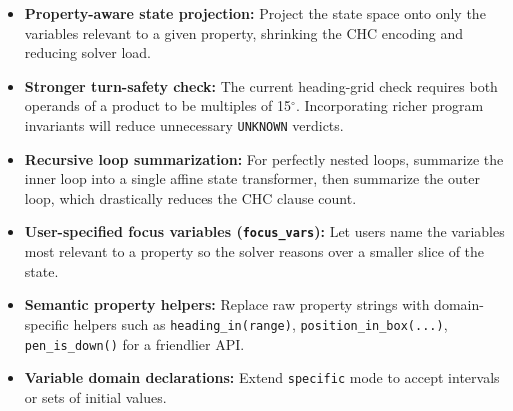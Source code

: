 \begin{itemize}
  \item \textbf{Property-aware state projection:} Project the state space onto only the variables relevant to a given property, shrinking the CHC encoding and reducing solver load.
  \item \textbf{Stronger turn-safety check:} The current heading-grid check requires both operands of a product to be multiples of 15$^\circ$. Incorporating richer program invariants will reduce unnecessary \texttt{UNKNOWN} verdicts.
  \item \textbf{Recursive loop summarization:} For perfectly nested loops, summarize the inner loop into a single affine state transformer, then summarize the outer loop, which drastically reduces the CHC clause count.
  \item \textbf{User-specified focus variables (\texttt{focus\_vars}):} Let users name the variables most relevant to a property so the solver reasons over a smaller slice of the state.
  \item \textbf{Semantic property helpers:} Replace raw property strings with domain-specific helpers such as \texttt{heading\_in(range)}, \texttt{position\_in\_box(...)}, \texttt{pen\_is\_down()} for a friendlier API.
  \item \textbf{Variable domain declarations:} Extend \texttt{specific} mode to accept intervals or sets of initial values.
\end{itemize}


